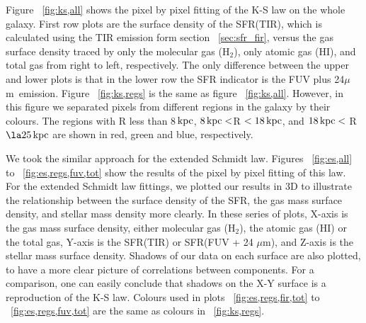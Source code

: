 \documentclass[useAMS,usenatbib]{mn2e}
\newcommand \kpc        {\,{\rm kpc}}
\newcommand \um    {$\mu$m\ }
\begin{document}
Figure ~\ref{fig:ks,all} shows the pixel by pixel fitting of the K-S law on the whole galaxy. First row plots are the surface density of the SFR(TIR), which is calculated using  the TIR emission form section ~\ref{sec:sfr_fir}, versus the gas surface density traced by only the molecular gas (H$_2$),  only atomic gas (HI), and total gas from right to left, respectively. The only difference between the upper and lower plots is that in the lower row the SFR indicator is the FUV plus 24\um emission. Figure ~\ref{fig:ks,regs} is the same as figure ~\ref{fig:ks,all}. However, in this figure we separated pixels from different regions in the galaxy by their colours. The regions with R less than 8$\kpc$, $8\kpc < $R $< 18\kpc$, and $18\kpc <$ R $\la 25\kpc$ are shown in red, green and blue, respectively. 


We took the similar approach for the extended Schmidt law. Figures ~\ref{fig:es,all} to ~\ref{fig:es,regs,fuv,tot} show the results of the pixel by pixel fitting of this law. For the extended Schmidt law fittings, we plotted our results in 3D to illustrate the relationship between the surface density of the SFR, the gas mass surface density, and stellar mass density more clearly. In these series of plots, X-axis is the gas mass  surface density, either molecular gas (H$_2$), the atomic gas (HI) or the total gas, Y-axis is the SFR(TIR) or SFR(FUV + 24 $\mu$m), and Z-axis is the stellar mass surface density. Shadows of our data on each surface are also plotted, to have a more clear picture of correlations between components. For a comparison, one can easily conclude that shadows on the X-Y surface is a reproduction of the K-S law. Colours used in plots ~\ref{fig:es,regs,fir,tot} to ~\ref{fig:es,regs,fuv,tot} are the same as colours in  ~\ref{fig:ks,regs}.
\end{document}
